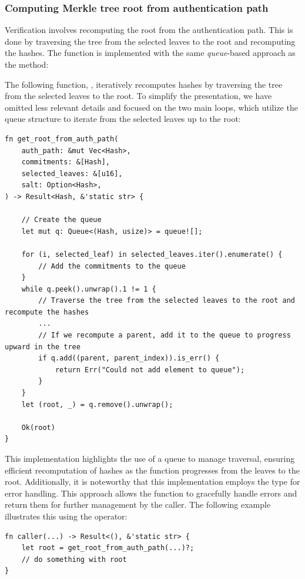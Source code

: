 \documentclass[11pt]{report}
\theoremstyle{definition}
\theoremstyle{plain}
\begin{document}
\subsubsection{Computing Merkle tree root from authentication path}\label{sub:get_root_from_auth_path}
Verification involves recomputing the root from the authentication path. This is done by traversing the tree from the selected leaves to the root and recomputing the hashes. The function is implemented with the same \textit{queue}-based approach as the  method:

The following function, , iteratively recomputes hashes by traversing the tree from the selected leaves to the root. To simplify the presentation, we have omitted less relevant details and focused on the two main loops, which utilize the queue structure to iterate from the selected leaves up to the root:

\begin{verbatim}
fn get_root_from_auth_path(
    auth_path: &mut Vec<Hash>,
    commitments: &[Hash],
    selected_leaves: &[u16],
    salt: Option<Hash>,
) -> Result<Hash, &'static str> {

    // Create the queue
    let mut q: Queue<(Hash, usize)> = queue![];

    for (i, selected_leaf) in selected_leaves.iter().enumerate() {
        // Add the commitments to the queue
    }
    while q.peek().unwrap().1 != 1 {
        // Traverse the tree from the selected leaves to the root and recompute the hashes
        ...
        // If we recompute a parent, add it to the queue to progress upward in the tree
        if q.add((parent, parent_index)).is_err() {
            return Err("Could not add element to queue");
        }
    }
    let (root, _) = q.remove().unwrap();

    Ok(root)
}
\end{verbatim}

This implementation highlights the use of a queue to manage traversal, ensuring efficient recomputation of hashes as the function progresses from the leaves to the root. Additionally, it is noteworthy that this implementation employs the  type for error handling. This approach allows the function to gracefully handle errors and return them for further management by the caller. The following example illustrates this using the  operator:

\begin{verbatim}
fn caller(...) -> Result<(), &'static str> {
    let root = get_root_from_auth_path(...)?;
    // do something with root
}
\end{verbatim}
\end{document}
